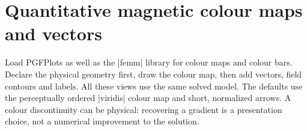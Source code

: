 \section{Quantitative magnetic colour maps and vectors}
\label{sec:quantitative-fields}

Load PGFPlots as well as the |femm| library for colour maps and colour bars.
Declare the physical geometry first, draw the colour map, then add vectors,
field contours and labels. All these views use the same solved model.
The defaults use the perceptually ordered |viridis| colour map and short,
normalized arrows. A colour discontinuity can be physical: recovering a gradient
is a presentation choice, not a numerical improvement to the solution.

